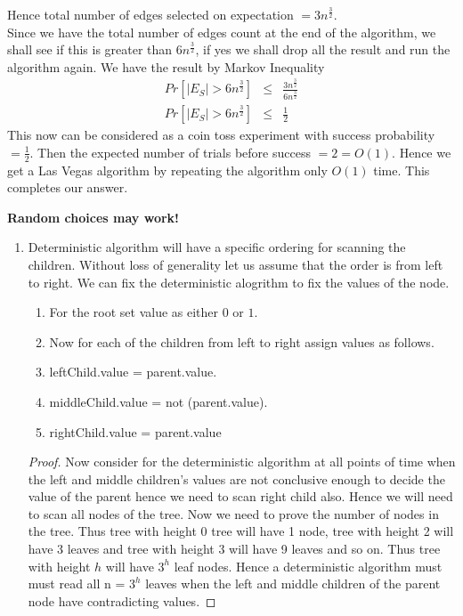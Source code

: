 \documentclass{assignment}
\begin{document}
\begin{problemlist}
\begin{problem}
\begin{answer}
\begin{enumerate}
\end{enumerate}

Hence total number of edges selected on expectation $ = 3 n^{\frac{3}{2}} $.  \\

Since we have the total number of edges count at the end of the algorithm, we shall see if this is greater than $ 6n^{\frac{3}{2}} $, if yes we shall drop all the result and run the algorithm again. 
We have the result by Markov Inequality
\begin{eqnarray}
 Pr\left[|E_S| > 6n^{\frac{3}{2}}\right] & \leq & \frac{3 n^{\frac{3}{2}}}{6n^{\frac{3}{2}}} \\
 Pr\left[|E_S| > 6n^{\frac{3}{2}}\right] & \leq & \frac{1}{2}
\end{eqnarray}
This now can be considered as a coin toss experiment with success probability $= \frac{1}{2}$. Then the expected number of trials before success $=2 = O(1)$. Hence we get a Las Vegas algorithm by repeating the algorithm only $O(1)$ time. This completes our answer.
\end{answer}


\end{problem}

\pbitem
\begin{problem} 
\textbf{Random choices may work!}
\begin{answer}
\begin{enumerate}
 \item 
Deterministic algorithm will have a specific ordering for scanning the children. Without loss of generality let us 
assume that the order is from left to right. We can fix the deterministic alogrithm to fix the values of the node.

\begin{enumerate}
\item For the root set value as either $0$ or $1$.
\item Now for each of the children from left to right assign values as follows.
\item leftChild.value = parent.value.
\item middleChild.value = not (parent.value).
\item rightChild.value = parent.value
\end{enumerate}

\begin{proof}
Now consider for the deterministic algorithm at all points of time when the left and middle children's values are not conclusive enough to decide the value of the parent hence 
we need to scan right child also. Hence we will need to scan all nodes of the tree. Now we need to prove the number of nodes in 
the tree.  Thus tree with height 0 tree will have 1 node, tree with height 2 will have 3 leaves and tree with height 3 will have 9 leaves and so on. Thus tree with height $h$ will have $3^h$ leaf nodes. 
Hence a deterministic algorithm must must read all n = $3^h$ leaves when the left and middle children of the parent node 
have contradicting values.
\end{proof}


\end{enumerate}
\end{answer}
\end{problem}
\end{problemlist}
\end{document}
